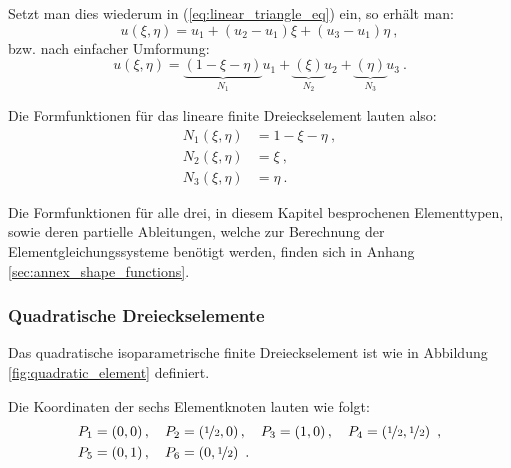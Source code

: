 Setzt man dies wiederum in (\ref{eq:linear_triangle_eq}) ein, so erhält man:
\begin{equation}
u(\xi, \eta) = u_1 + (u_2 - u_1)\xi + (u_3 - u_1)\eta \ ,
\end{equation}
bzw. nach einfacher Umformung:
\begin{equation}
u(\xi, \eta) = \underbrace{(1 - \xi - \eta)}_{N_1} u_1 + \underbrace{(\xi)}_{N_2} u_2 + \underbrace{(\eta)}_{N_3} u_3\ .
\end{equation}

Die Formfunktionen für das lineare finite Dreieckselement lauten also:
	\begin{align}
		N_1(\xi, \eta) &= 1 - \xi - \eta\ , \\
		N_2(\xi, \eta) &= \xi \ ,\nonumber \\
		N_3(\xi, \eta) &= \eta \ .\nonumber
	\end{align}
	
Die Formfunktionen für alle drei, in diesem Kapitel besprochenen Elementtypen, sowie deren partielle Ableitungen, welche zur Berechnung der Elementgleichungssysteme benötigt werden, finden sich in Anhang \ref{sec:annex_shape_functions}.
	
	
	
	

\subsubsection{Quadratische Dreieckselemente}
Das quadratische isoparametrische finite Dreieckselement ist wie in Abbildung \ref{fig:quadratic_element} definiert.

Die Koordinaten der sechs Elementknoten lauten wie folgt:
\begin{align}
&P_1 = \coord{0}{0}, \quad P_2 = \coord{\nicefrac{1}{2}}{0}, \quad P_3 = \coord{1}{0}, \quad P_4 = \coord{\nicefrac{1}{2}}{\nicefrac{1}{2}} \ ,\\
&P_5 = \coord{0}{1}, \quad P_6 = \coord{0}{\nicefrac{1}{2}} \ .\nonumber
\end{align}

